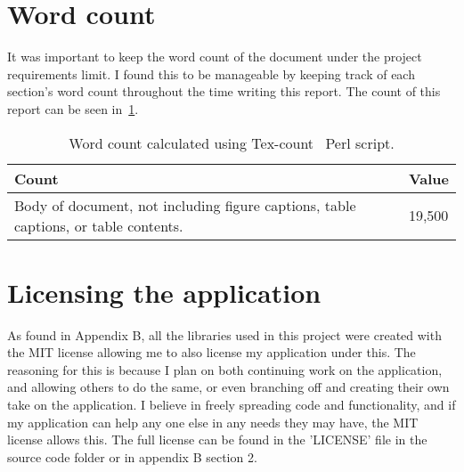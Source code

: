 \section{Word count}
It was important to keep the word count of the document under the project requirements limit. I found this to be manageable by keeping track of each section's word count throughout the time writing this report. The count of this report can be seen in~\ref{tbl:count}.

\begin{table}[h!]
	\caption{Word count calculated using Tex-count~\cite{count} Perl script.}
	\begin{tabular}{|l|l|}
		\hline
		\textbf{Count} & \textbf{Value}                                                                \\ \hline
		Body of document, not including figure captions, table captions, or table contents.   &  19,500\\ \hline
	\end{tabular}
	\label{tbl:count}
\end{table}

\section{Licensing the application}

As found in Appendix B, all the libraries used in this project were created with the MIT license allowing me to also license my application under this. The reasoning for this is because I plan on both continuing work on the application, and allowing others to do the same, or even branching off and creating their own take on the application. I believe in freely spreading code and functionality, and if my application can help any one else in any needs they may have, the MIT license allows this. The full license can be found in the 'LICENSE' file in the source code folder or in appendix B section 2.
